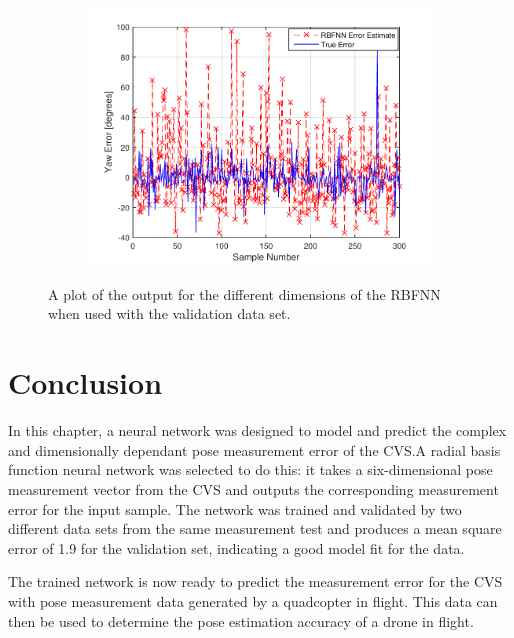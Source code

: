 \begin{figure}
\begin{subfigure}{0.3\textwidth}
    \includegraphics[width=\textwidth]{figures/chapter4/yaw_valid}
    \caption{}
    \label{fig:rbfnn-valid-yaw}
  \end{subfigure}
  \caption[The output of the RBFNN with the validation set input.]{A plot of the output for the different dimensions of the RBFNN when used with the validation data set.}
  \label{fig:chap4-rbf-valid}
\end{figure}

\section{Conclusion}

In this chapter, a neural network was designed to model and predict the complex and dimensionally dependant pose measurement error of the CVS.\@ A radial basis function neural network was selected to do this: it takes a six-dimensional pose measurement vector from the CVS and outputs the corresponding measurement error for the input sample. The network was trained and validated by two different data sets from the same measurement test and produces a mean square error of 1.9 for the validation set, indicating a good model fit for the data. 

The trained network is now ready to predict the measurement error for the CVS with pose measurement data generated by a quadcopter in flight. This data can then be used to determine the pose estimation accuracy of a drone in flight. 
